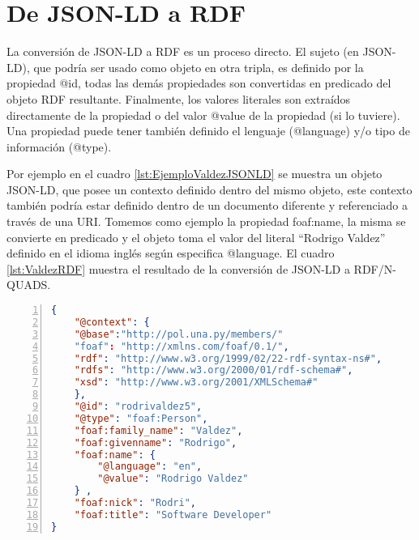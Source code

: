 \section{De JSON-LD a RDF}

La conversión de JSON-LD a RDF es un proceso directo. El sujeto (en JSON-LD), que podría ser usado como objeto en otra tripla, es definido por la propiedad @id, todas las demás propiedades son convertidas en predicado del objeto RDF resultante. Finalmente, los valores literales son extraídos directamente de la propiedad o del valor @value de la propiedad (si lo tuviere). Una propiedad puede tener también definido el lenguaje (@language) y/o tipo de información (@type).

Por ejemplo en el cuadro \ref{lst:EjemploValdezJSONLD} se muestra un objeto JSON-LD, que posee un contexto definido dentro del mismo objeto, este contexto también podría estar definido dentro de un documento diferente y referenciado a través de una URI. Tomemos como ejemplo la propiedad foaf:name, la misma se convierte en predicado y el objeto toma el valor del literal “Rodrigo Valdez” definido en el idioma inglés según especifica @language. El cuadro \ref{lst:ValdezRDF} muestra el resultado de la conversión de JSON-LD a RDF/N-QUADS.


\begin{minipage}{\textwidth}
    \begin{lstlisting}[captionpos=b, caption=Objeto JSON-LD. , label=lst:EjemploValdezJSONLD, language=json,firstnumber=1,  numbers=left,  numberstyle=\tiny\color{mygray},frame=single]
{
	"@context": {
	"@base":"http://pol.una.py/members/"
	"foaf": "http://xmlns.com/foaf/0.1/",
	"rdf": "http://www.w3.org/1999/02/22-rdf-syntax-ns#",
	"rdfs": "http://www.w3.org/2000/01/rdf-schema#",
	"xsd": "http://www.w3.org/2001/XMLSchema#"
	},
	"@id": "rodrivaldez5",
	"@type": "foaf:Person",
	"foaf:family_name": "Valdez",
	"foaf:givenname": "Rodrigo",
	"foaf:name": {
		"@language": "en",
		"@value": "Rodrigo Valdez"
	} ,
	"foaf:nick": "Rodri",
	"foaf:title": "Software Developer"
}

        \end{lstlisting}
    \end{minipage}


